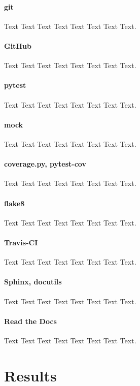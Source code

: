 \documentclass{bioinfo}
\begin{document}
\paragraph{git\textcolon} 
Text Text Text Text Text Text  Text Text.

\paragraph{GitHub\textcolon} 
Text Text Text Text Text Text  Text Text.

\paragraph{pytest\textcolon} 
Text Text Text Text Text Text  Text Text.

\paragraph{mock\textcolon} 
Text Text Text Text Text Text  Text Text.

\paragraph{coverage.py, pytest-cov\textcolon} 
Text Text Text Text Text Text  Text Text.

\paragraph{flake8\textcolon} 
Text Text Text Text Text Text  Text Text.

\paragraph{Travis-CI\textcolon} 
Text Text Text Text Text Text  Text Text.

\paragraph{Sphinx, docutils\textcolon} 
Text Text Text Text Text Text  Text Text.

\paragraph{Read the Docs\textcolon} 
Text Text Text Text Text Text  Text Text.

\section{Results}
\end{document}

